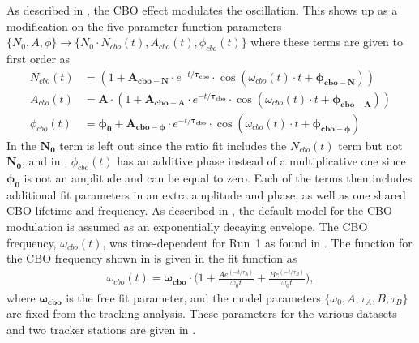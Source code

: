 As described in , the CBO effect modulates the \wa oscillation. This shows up as a modification on the five parameter function parameters $\{N_{0}, A, \phi\} \rightarrow \{N_{0} \cdot N_{cbo}(t), A_{cbo}(t), \phi_{cbo}(t)\}$ where these terms are given to first order as
    \begin{align}
        N_{cbo}(t) &= (1 + \boldsymbol{A_{cbo-N}} \cdot e^{-t/\boldsymbol{\tau_{cbo}}} \cdot \cos(\omega_{cbo}(t) \cdot t + \boldsymbol{\phi_{cbo-N}})) \label{eq:Ncbo} \\ 
        A_{cbo}(t) &= \boldsymbol{A} \cdot (1 + \boldsymbol{A_{cbo-A}} \cdot e^{-t/\boldsymbol{\tau_{cbo}}} \cdot \cos(\omega_{cbo}(t) \cdot t + \boldsymbol{\phi_{cbo-A}})) \label{eq:Acbo} \\ 
        \phi_{cbo}(t) &= \boldsymbol{\phi_{0}} + \boldsymbol{A_{cbo-\phi}} \cdot e^{-t/\boldsymbol{\tau_{cbo}}} \cdot \cos(\omega_{cbo}(t) \cdot t + \boldsymbol{\phi_{cbo-\phi}}) \label{eq:Phicbo}
    \end{align}
In  the $\boldsymbol{N_{0}}$ term is left out since the ratio fit includes the $N_{cbo}(t)$ term but not $\boldsymbol{N_{0}}$, and in , $\phi_{cbo}(t)$ has an additive phase instead of a multiplicative one since $\boldsymbol{\phi_{0}}$ is not an amplitude and can be equal to zero. Each of the terms then includes additional fit parameters in an extra amplitude and phase, as well as one shared CBO lifetime and frequency. As described in , the default model for the CBO modulation is assumed as an exponentially decaying envelope. The CBO frequency, $\omega_{cbo}(t)$, was time-dependent for Run~1 as found in . The function for the CBO frequency shown in  is given in the fit function as
    \begin{align} \label{eq:CBOfreqForm}
        \omega_{cbo}(t) = \boldsymbol{\omega_{cbo}} \cdot \Big(1 + \frac{Ae^{(-t/\tau_{A})}}{\omega_{0}t} + \frac{Be^{(-t/\tau_{B})}}{\omega_{0}t}\Big),
    \end{align}
where $\boldsymbol{\omega_{cbo}}$ is the free fit parameter, and the model parameters $\{\omega_{0}, A, \tau_{A}, B, \tau_{B}\}$ are fixed from the tracking analysis. These parameters for the various datasets and two tracker stations are given in . 



